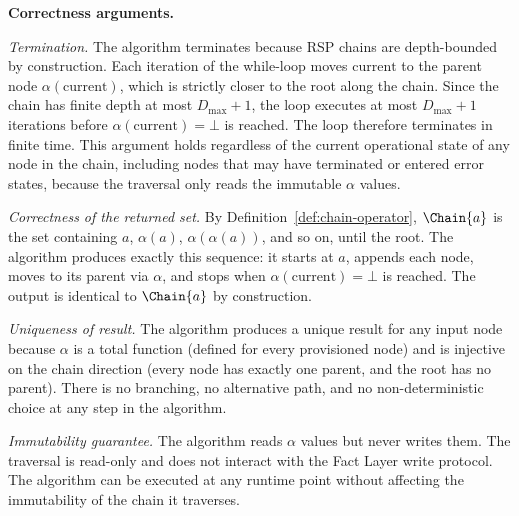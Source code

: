 \medskip
\noindent\textbf{Correctness arguments.}

\textit{Termination.} The algorithm terminates because RSP chains are depth-bounded by construction. Each iteration of the while-loop moves $\text{current}$ to the parent node $\alpha(\text{current})$, which is strictly closer to the root along the chain. Since the chain has finite depth at most $D_{\max} + 1$, the loop executes at most $D_{\max} + 1$ iterations before $\alpha(\text{current}) = \bot$ is reached. The loop therefore terminates in finite time. This argument holds regardless of the current operational state of any node in the chain, including nodes that may have terminated or entered error states, because the traversal only reads the immutable $\alpha$ values.

\textit{Correctness of the returned set.} By Definition~\ref{def:chain-operator}, $\Chain{a}$ is the set containing $a$, $\alpha(a)$, $\alpha(\alpha(a))$, and so on, until the root. The algorithm produces exactly this sequence: it starts at $a$, appends each node, moves to its parent via $\alpha$, and stops when $\alpha(\text{current}) = \bot$ is reached. The output is identical to $\Chain{a}$ by construction.

\textit{Uniqueness of result.} The algorithm produces a unique result for any input node because $\alpha$ is a total function (defined for every provisioned node) and is injective on the chain direction (every node has exactly one parent, and the root has no parent). There is no branching, no alternative path, and no non-deterministic choice at any step in the algorithm.

\textit{Immutability guarantee.} The algorithm reads $\alpha$ values but never writes them. The traversal is read-only and does not interact with the Fact Layer write protocol. The algorithm can be executed at any runtime point without affecting the immutability of the chain it traverses.

